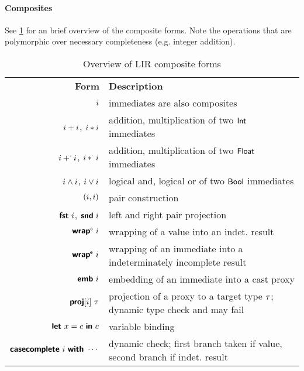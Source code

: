 \documentclass[index.tex]{subfiles}
\begin{document}
\paragraph{Composites}
See \cref{fig:lir-syntax-comp} for an brief overview of the composite forms. Note the operations that
are polymorphic over necessary completeness (e.g. integer addition).

\begin{table}
  \begin{center}
    \begin{tabular}{rl}
      \textbf{Form} & \textbf{Description} \\

      $i$ 
        & immediates are also composites \\
      
      $i + i$, $i * i$
        & addition, multiplication of two $\textsf{Int}$ immediates \\

      $i +^{\cdot} i$, $i *^{\cdot} i$
        & addition, multiplication of two $\textsf{Float}$ immediates \\

      $i \land i$, $i \lor i$
        & logical and, logical or of two $\textsf{Bool}$ immediates \\

      $(i, i)$
        & pair construction \\

      $\textsf{\textbf{fst}}~ i$, $\textsf{\textbf{snd}}~ i$
        & left and right pair projection \\

      $\EWrapIntoNI{\SortImmVar}$
        & wrapping of a value into an indet. result \\

      $\EWrapIntoII{\SortImmVar}$
        & wrapping of an immediate into a indeterminately incomplete
        result \\

      $\textsf{\textbf{emb}}~ i$
        & embedding of an immediate into a cast proxy \\

      $\textsf{\textbf{proj}}[i]~ \tau$
        & projection of a proxy to a target type $\tau$; dynamic type check and may fail \\

      $\textsf{\textbf{{let}}}~ x = c ~\textsf{\textbf{{in}}}~ c$
        & variable binding \\

      $\textsf{\textbf{casecomplete}}~ i ~\textsf{\textbf{{with}}} ~\cdots$
        & dynamic check; first branch taken if value, second branch if indet. result
    \end{tabular}
  \end{center}
  \caption{Overview of LIR composite forms}
  \label{fig:lir-syntax-comp}
\end{table}
\end{document}
